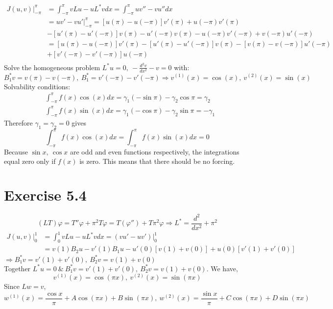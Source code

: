 \documentclass[a4paper, 11pt]{article}
\begin{document}
\begin{spacing}{1.5}
\begin{align*}
J(u,v) \Big|_{-\pi}^\pi 
& =  \int_{-\pi}^{\pi} vLu - uL^*vdx = \int_{-\pi}^{\pi} uv'' - vu''dx  \\
& = uv' - vu' \Big|_{-\pi}^\pi = \left[ u(\pi) - u(-\pi) \right] v'(\pi) + u(-\pi) v'(\pi)  \\ 
&- \left[ u'(\pi)  - u'(-\pi) \right] v(\pi) -u'(-\pi) v(\pi) - u(-\pi) v'(-\pi) + v(-\pi)u'(-\pi) \\ 
& = \left[ u(\pi) - u(-\pi) \right] v'(\pi) - \left[ u'(\pi)  - u'(-\pi) \right] v(\pi) - \left[ v(\pi) - v(-\pi) \right] u'(-\pi) \\
&+ \left[ v'(-\pi) -v'(-\pi)\right]u(-\pi) \\  
\end{align*}
Solve the homogeneous problem $L^*u=0, \ -\frac{d^2v}{dx^2} - v =0$ with: $B_1^*v = v(\pi) - v(-\pi), \ B_1^* = v'(-\pi) - v'(-\pi) \Rightarrow v^{(1)}(x)  = \cos(x), \ v^{(2)} (x) = \sin(x)$
Solvability conditions:
\begin{align*}
& \int_{-\pi}^{\pi} f(x) \cos(x)dx = \gamma_1(-\sin\pi) - \gamma_2 \cos\pi = \gamma_2 \\
& \int_{-\pi}^{\pi} f(x) \sin(x)dx = \gamma_1(-\cos\pi) - \gamma_2 \sin\pi = -\gamma_1
\end{align*}
Therefore $\gamma_1 = \gamma_2 =0 $ gives
$$
\int_{-\pi}^{\pi} f(x) \cos(x)dx =\int_{-\pi}^{\pi} f(x) \sin(x)dx =0
$$
Because $\sin x, \ \cos x$ are odd and even functions respectively, the integrations equal zero only if $f(x)$ is zero. This means that there should be no forcing.


\section*{Exercise 5.4}
$$
(LT)\varphi = T''\varphi + \pi^2 T \varphi = T(\varphi'') + T\pi^2\varphi \Rightarrow L^* = \frac{d^2}{dx^2} + \pi^2
$$
\begin{align*}
J(u,v) \Big|_0^1 
& = \int_{0}^{1} vLu - uL^*vdx = (vu'-uv')\Big|_0^1\\
& = v(1) B_2u - v'(1) B_1u - u'(0) \left[v(1) + v(0) \right] + u(0) \left[v'(1) + v'(0)\right]
\end{align*}
$\Rightarrow B_1^*v = v'(1) +v'(0) , \ B_2^*v=v(1) +v(0)$ \\
Together $L^*u=0 \ \& \  B_1^*v = v'(1) +v'(0) , \ B_2^*v=v(1) +v(0)$. We have, 
$$
v^{(1)}(x) = \cos(\pi x), \ v^{(2)} (x) = \sin(\pi x)
$$
Since $Lw=v$,
$$
w^{(1)} (x) = \frac{\cos x}{\pi} + A \cos(\pi x) + B  \sin(\pi x), \ 
w^{(2)} (x) = \frac{\sin x}{\pi} + C \cos(\pi x) + D  \sin(\pi x)
$$


\end{spacing}
\end{document}
